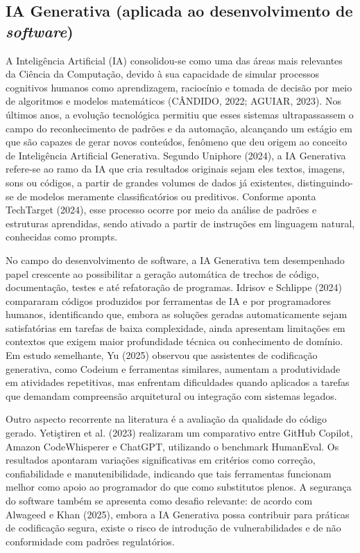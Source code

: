 \documentclass[english,brazilian]{UNISINOSartigo} %
\begin{document}
\subsection{IA Generativa (aplicada ao desenvolvimento de \textit{software})}

A Inteligência Artificial (IA) consolidou-se como uma das áreas mais relevantes da Ciência da Computação, devido à sua capacidade de simular processos cognitivos humanos como aprendizagem, raciocínio e tomada de decisão por meio de algoritmos e modelos matemáticos (CÂNDIDO, 2022; AGUIAR, 2023). Nos últimos anos, a evolução tecnológica permitiu que esses sistemas ultrapassassem o campo do reconhecimento de padrões e da automação, alcançando um estágio em que são capazes de gerar novos conteúdos, fenômeno que deu origem ao conceito de Inteligência Artificial Generativa. Segundo Uniphore (2024), a IA Generativa refere-se ao ramo da IA que cria resultados originais sejam eles textos, imagens, sons ou códigos, a partir de grandes volumes de dados já existentes, distinguindo-se de modelos meramente classificatórios ou preditivos. Conforme aponta TechTarget (2024), esse processo ocorre por meio da análise de padrões e estruturas aprendidas, sendo ativado a partir de instruções em linguagem natural, conhecidas como prompts.

No campo do desenvolvimento de software, a IA Generativa tem desempenhado papel crescente ao possibilitar a geração automática de trechos de código, documentação, testes e até refatoração de programas. Idrisov e Schlippe (2024) compararam códigos produzidos por ferramentas de IA e por programadores humanos, identificando que, embora as soluções geradas automaticamente sejam satisfatórias em tarefas de baixa complexidade, ainda apresentam limitações em contextos que exigem maior profundidade técnica ou conhecimento de domínio. Em estudo semelhante, Yu (2025) observou que assistentes de codificação generativa, como Codeium e ferramentas similares, aumentam a produtividade em atividades repetitivas, mas enfrentam dificuldades quando aplicados a tarefas que demandam compreensão arquitetural ou integração com sistemas legados.

Outro aspecto recorrente na literatura é a avaliação da qualidade do código gerado. Yetiştiren et al. (2023) realizaram um comparativo entre GitHub Copilot, Amazon CodeWhisperer e ChatGPT, utilizando o benchmark HumanEval. Os resultados apontaram variações significativas em critérios como correção, confiabilidade e manutenibilidade, indicando que tais ferramentas funcionam melhor como apoio ao programador do que como substitutos plenos. A segurança do software também se apresenta como desafio relevante: de acordo com Alwageed e Khan (2025), embora a IA Generativa possa contribuir para práticas de codificação segura, existe o risco de introdução de vulnerabilidades e de não conformidade com padrões regulatórios.
\end{document}
